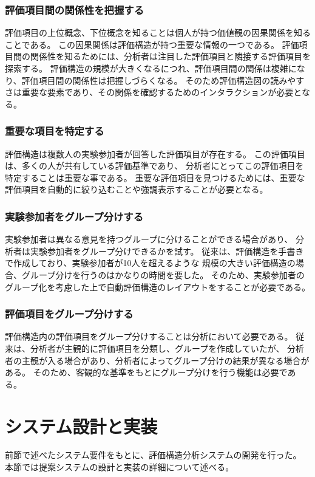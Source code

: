 \documentclass[syuuron]{kuee}
\begin{document}
		\subsubsection{評価項目間の関係性を把握する}
			評価項目の上位概念、下位概念を知ることは個人が持つ価値観の因果関係を知ることである。
			この因果関係は評価構造が持つ重要な情報の一つである。
			評価項目間の関係性を知るためには、分析者は注目した評価項目と隣接する評価項目を探索する。
			評価構造の規模が大きくなるにつれ、評価項目間の関係は複雑になり、評価項目間の関係性は把握しづらくなる。
			そのため評価構造図の読みやすさは重要な要素であり、その関係を確認するためのインタラクションが必要となる。
		\subsubsection{重要な項目を特定する}
			評価構造は複数人の実験参加者が回答した評価項目が存在する。
			この評価項目は、多くの人が共有している評価基準であり、
			分析者にとってこの評価項目を特定することは重要な事である。
			重要な評価項目を見つけるためには、重要な評価項目を自動的に絞り込むことや強調表示することが必要となる。
		\subsubsection{実験参加者をグループ分けする}%
			実験参加者は異なる意見を持つグループに分けることができる場合があり、
			分析者は実験参加者をグループ分けできるかを試す。
			従来は、評価構造を手書きで作成しており、実験参加者が10人を超えるような
			規模の大きい評価構造の場合、グループ分けを行うのはかなりの時間を要した。
			そのため、実験参加者のグループ化を考慮した上で自動評価構造のレイアウトをすることが必要である。
		\subsubsection{評価項目をグループ分けする}%
			評価構造内の評価項目をグループ分けすることは分析において必要である。
			従来は、分析者が主観的に評価項目を分類し、グループを作成していたが、
			分析者の主観が入る場合があり、分析者によってグループ分けの結果が異なる場合がある。
			そのため、客観的な基準をもとにグループ分けを行う機能は必要である。
	\section{システム設計と実装}
		前節で述べたシステム要件をもとに、評価構造分析システムの開発を行った。
		本節では提案システムの設計と実装の詳細について述べる。
\end{document}

